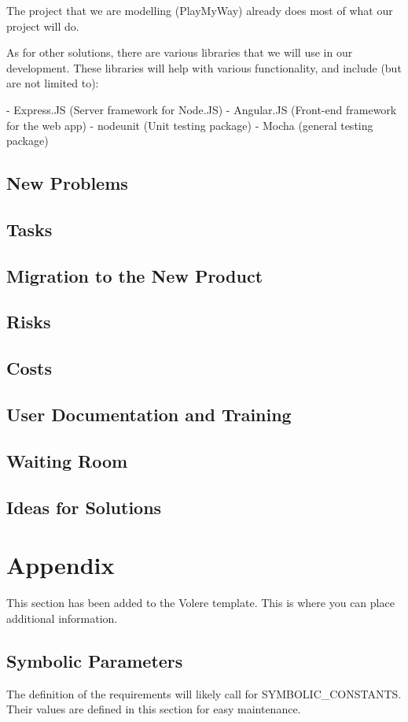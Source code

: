 \documentclass[12pt, titlepage]{article}
\begin{document}
The project that we are modelling (PlayMyWay) already does most of what our
project will do.

As for other solutions, there are various libraries that we will use in our
development. These libraries will help with various functionality, and include
(but are not limited to):

- Express.JS (Server framework for Node.JS)
- Angular.JS (Front-end framework for the web app)
- nodeunit (Unit testing package)
- Mocha (general testing package)

\subsection{New Problems}

\subsection{Tasks}

\subsection{Migration to the New Product}

\subsection{Risks}

\subsection{Costs}

\subsection{User Documentation and Training}

\subsection{Waiting Room}

\subsection{Ideas for Solutions}





\newpage

\section{Appendix}

This section has been added to the Volere template.  This is where you can place
additional information.

\subsection{Symbolic Parameters}

The definition of the requirements will likely call for SYMBOLIC\_CONSTANTS.
Their values are defined in this section for easy maintenance.
\end{document}
